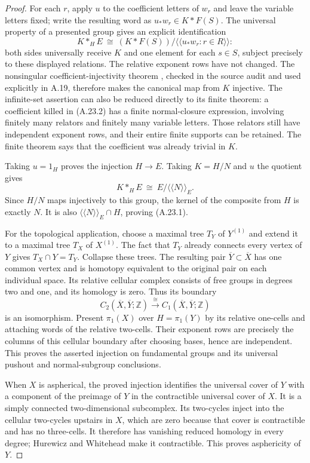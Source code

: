 \begin{proof}
For each $r$, apply $u$ to the coefficient letters of $w_r$ and
leave the variable letters fixed; write the resulting word as
$u_*w_r\in K*F(S)$. The universal property of a presented group
gives an explicit identification
\[
 K*_H E\ \cong\
 (K*F(S))/\langle\!\langle u_*w_r:r\in R\rangle\!\rangle:
 \tag{A.23.2}
\]
both sides universally receive $K$ and one element for each
$s\in S$, subject precisely to these displayed relations.
The relative exponent rows have not changed. The nonsingular
coefficient-injectivity theorem
\cite[Theorem~1 and Remark~5.1]{D_OpenAI2026Nonsingular}, checked
in the source audit and used explicitly in A.19, therefore makes
the canonical map from $K$ injective. The infinite-set assertion
can also be reduced directly to its finite theorem: a coefficient
killed in (A.23.2) has a finite normal-closure expression, involving
finitely many relators and finitely many variable letters. Those
relators still have independent exponent rows, and their entire
finite supports can be retained. The finite theorem says that the
coefficient was already trivial in $K$.

Taking $u=1_H$ proves the injection $H\to E$. Taking
$K=H/N$ and $u$ the quotient gives
\[
 K*_H E\ \cong\ E/\langle\!\langle N\rangle\!\rangle_E.
\]
Since $H/N$ maps injectively to this group, the kernel of the
composite from $H$ is exactly $N$. It is also
$\langle\!\langle N\rangle\!\rangle_E\cap H$, proving
(A.23.1).

For the topological application, choose a maximal tree $T_Y$ of
$Y^{(1)}$ and extend it to a maximal tree $T_X$ of $X^{(1)}$.
The fact that $T_Y$ already connects every vertex of $Y$ gives
$T_X\cap Y=T_Y$. Collapse these trees. The resulting pair
$\overline Y\subset\overline X$ has one common vertex and is
homotopy equivalent to the original pair on each individual
space. Its relative cellular complex consists of free groups in
degrees two and one, and its homology is zero. Thus its boundary
\[
 C_2(\overline X,\overline Y;\mathbb Z)
 \xrightarrow{\ \cong\ }
 C_1(\overline X,\overline Y;\mathbb Z)
\]
is an isomorphism. Present $\pi_1(X)$ over $H=\pi_1(Y)$ by its
relative one-cells and attaching words of the relative two-cells.
Their exponent rows are precisely the columns of this cellular
boundary after choosing bases, hence are independent. This proves
the asserted injection on fundamental groups and its universal
pushout and normal-subgroup conclusions.

When $X$ is aspherical, the proved injection identifies the
universal cover of $Y$ with a component of the preimage of $Y$
in the contractible universal cover of $X$. It is a
simply connected two-dimensional subcomplex. Its two-cycles
inject into the cellular two-cycles upstairs in $X$, which are
zero because that cover is contractible and has no three-cells.
It therefore has vanishing reduced homology in every degree;
Hurewicz and Whitehead make it contractible. This proves
asphericity of $Y$.


\end{proof}

